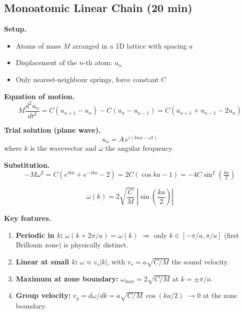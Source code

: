 \documentclass[11pt,a4paper]{article}
\begin{document}
\subsection{Monoatomic Linear Chain \hfill \small(20 min)}

\textbf{Setup.}
\begin{itemize}
\item Atoms of mass $M$ arranged in a 1D lattice with spacing $a$
\item Displacement of the $n$-th atom: $u_n$
\item Only nearest-neighbour springs, force constant $C$
\end{itemize}

\textbf{Equation of motion.}
\[
M\frac{d^2u_n}{dt^2} = C(u_{n+1}-u_n) - C(u_n-u_{n-1})
= C(u_{n+1}+u_{n-1}-2u_n)
\]

\textbf{Trial solution (plane wave).}
\[
u_n = A\,e^{i(kna-\omega t)}
\]
where $k$ is the wavevector and $\omega$ the angular frequency.

\textbf{Substitution.}
\[
-M\omega^2 = C\left(e^{ika}+e^{-ika}-2\right) = 2C(\cos ka - 1) = -4C\sin^2\!\left(\tfrac{ka}{2}\right)
\]

\begin{keybox}
\[
\omega(k) = 2\sqrt{\frac{C}{M}}\;\left|\sin\!\left(\frac{ka}{2}\right)\right|
\]
\end{keybox}

\textbf{Key features.}
\begin{enumerate}
\item \textbf{Periodic in $k$:} $\omega(k+2\pi/a)=\omega(k)$ $\Rightarrow$ only $k\in[-\pi/a,\pi/a]$ (first Brillouin zone) is physically distinct.
\item \textbf{Linear at small $k$:} $\omega \approx v_s|k|$, with $v_s = a\sqrt{C/M}$ the sound velocity.
\item \textbf{Maximum at zone boundary:} $\omega_{\max}=2\sqrt{C/M}$ at $k=\pm\pi/a$.
\item \textbf{Group velocity:} $v_g = d\omega/dk = a\sqrt{C/M}\,\cos(ka/2)$ $\to 0$ at the zone boundary.
\end{enumerate}
\end{document}
